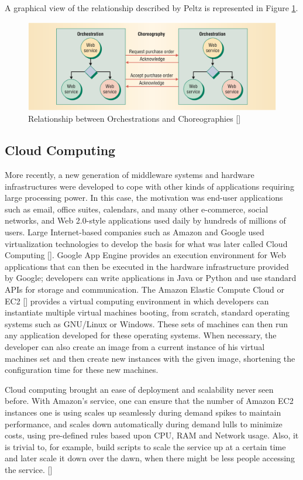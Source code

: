 A graphical view of the relationship described by Peltz is represented in Figure \ref{relation-orchestrationXchoreography}.

\begin{figure}[htb]
	\centering
	\includegraphics[width=\textwidth]{images/relation-orchestrationXchoreography}
	\caption{Relationship between Orchestrations and Choreographies [\citet{WSOC}]}
	\label{relation-orchestrationXchoreography}
\end{figure}




\subsection{Cloud Computing}
More recently, a new generation of middleware systems and hardware infrastructures were developed to cope with other kinds of applications requiring large processing power. In this case, the motivation was end-user applications such as email, office suites, calendars, and many other e-commerce, social networks, and Web 2.0-style applications used daily by hundreds of millions of users. Large Internet-based companies such as Amazon and Google used virtualization technologies to develop the basis for what was later called Cloud Computing [\citet{ZCB10}]. Google App Engine provides an execution environment for Web applications that can then be executed in the hardware infrastructure provided by Google; developers can write applications in Java or Python and use standard APIs for storage and communication.  The Amazon Elastic Compute Cloud or EC2 [\citet{EC2}] provides a virtual computing environment in which developers can instantiate multiple virtual machines booting, from scratch, standard operating systems such as GNU/Linux or Windows. These sets of machines can then run any application developed for these operating systems. When necessary, the developer can also create an image from a current instance of his virtual machines set and then create new instances with the given image, shortening the configuration time for these new machines.

Cloud computing brought an ease of deployment and scalability never seen before. With Amazon's service, one can ensure that the number of Amazon EC2 instances one is using scales up seamlessly during demand spikes to maintain performance, and scales down automatically during demand lulls to minimize costs, using pre-defined rules based upon CPU, RAM and Network usage. Also, it is trivial to, for example, build scripts to scale the service up at a certain time and later scale it down over the dawn, when there might be less people accessing the service. [\citet{AUTO-SCALE}]

